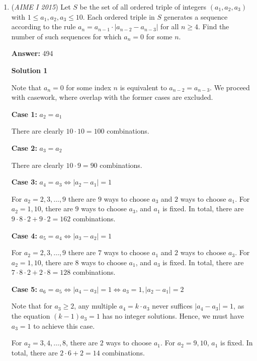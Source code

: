 \begin{enumerate}
 Therefore, the minimal of $n$ is $\boxed{695}$.

 


	\item (\textit{AIME I 2015}) Let $S$ be the set of all ordered triple of integers $(a_1,a_2,a_3)$ with $1 \le a_1,a_2,a_3 \le 10$. Each ordered triple in $S$ generates a sequence according to the rule $a_n=a_{n-1}\cdot | a_{n-2}-a_{n-3} |$ for all $n\ge 4$. Find the number of such sequences for which $a_n=0$ for some $n$.


 
 \textbf{Answer: }494



\textbf{Solution 1}

Note that $a_n=0$ for some index $n$ is equivalent to $a_{n-2}=a_{n-3}$. We proceed with casework, where overlap with the former cases are excluded.

 \textbf{Case 1: }$a_{2}=a_{1}$

 There are clearly $10\cdot 10=100$ combinations.

 \textbf{Case 2: }$a_{3}=a_{2}$

 There are clearly $10\cdot 9=90$ combinations.

 \textbf{Case 3: }$a_{4}=a_{3}\iff \lvert a_{2}-a_{1}\lvert =1$

 For $a_{2}=2,3,\ldots, 9$ there are $9$ ways to choose $a_{3}$ and $2$ ways to choose $a_{1}$. For $a_{2}=1, 10$, there are $9$ ways to choose $a_{3}$, and $a_{1}$ is fixed. In total, there are $9\cdot 8\cdot 2+9\cdot 2=162$ combinations.

 \textbf{Case 4: }$a_{5}=a_{4}\iff \lvert a_{3}-a_{2}\lvert =1$

 For $a_{2}=2,3,\ldots, 9$ there are $7$ ways to choose $a_{1}$ and $2$ ways to choose $a_{3}$. For $a_{2}=1, 10$, there are $8$ ways to choose $a_{1}$, and $a_{3}$ is fixed. In total, there are $7\cdot 8\cdot 2+2\cdot 8=128$ combinations.

 \textbf{Case 5: }$a_{6}=a_{5}\iff \lvert a_{4}-a_{3}\lvert =1 \iff a_{3}=1, \lvert a_{2}-a_{1}\rvert = 2$

 Note that for $a_{3}\ge 2$, any multiple $a_{4}=k\cdot a_{3}$ never suffices $\lvert a_{4}-a_{3}\rvert=1$, as the equation $(k-1)a_{3}=1$ has no integer solutions. Hence, we must have $a_{3}=1$ to achieve this case.

 For $a_{2}=3,4,\ldots, 8$, there are $2$ ways to choose $a_{1}$. For $a_{2}=9,10$, $a_{1}$ is fixed. In total, there are $2\cdot 6+2=14$ combinations.


\end{enumerate}
